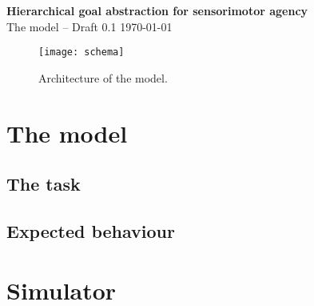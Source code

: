 \documentclass[11pt]{article}
\begin{document}
\begin{center} \huge{\bfseries{Hierarchical goal abstraction for sensorimotor
    agency}}\\ {The model -- Draft 0.1 \today}\\[3cm] \end{center}


\begin{figure}[H] \centering \texttt{[image: schema]}
    \caption{Architecture of the model.} \label{fig:blueprint} \end{figure}

\section{The model}
\label{sec:model}

\subsection{The task}
\label{sec:task}

\subsection{Expected behaviour}
\label{sec:behaviour}

\section{Simulator}
\label{sec:simulator}
\end{document}
